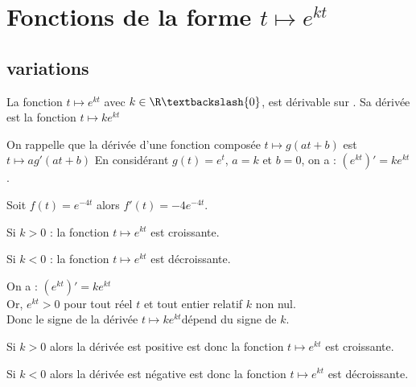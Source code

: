     \section{Fonctions de la forme $t\mapsto e^{kt}$}
        \subsection{variations}
            \begin{bprop}
                La fonction $t\mapsto e^{kt}$ avec $k\in \R\textbackslash \{0 \}$, est dérivable sur \R. Sa dérivée est la fonction  $t\mapsto ke^{kt}$
            \end{bprop}
            
            \begin{bdemo}
                On rappelle que la dérivée d'une fonction composée $t\mapsto g(at+b)$ est $t\mapsto ag'(at+b)$
                En considérant $g(t)=e^t$, $a=k$ et $b=0$, on a : $(e^{kt})'=ke^{kt}$.
            \end{bdemo}
            
            \begin{bexemple}
                Soit $f(t)=e^{-4t}$ alors $f'(t)=-4e^{-4t}$.
            \end{bexemple}
            
            \begin{bprop}
                \begin{itemDef}
                    \item Si $k > 0$ : la fonction $t\mapsto e^{kt}$ est croissante.
                    \item Si $k < 0$ : la fonction $t\mapsto e^{kt}$ est décroissante.
                \end{itemDef}
            \end{bprop}
            
            \begin{bdemo}
                On a : $(e^{kt} )'=ke^{kt}$\\
                Or, $e^{kt}>0$ pour tout réel $t$ et tout entier relatif $k$ non nul.\\
                Donc le signe de la dérivée $t\mapsto ke^{kt}$dépend du signe de $k$.\\
                \begin{itemDem}
                \item Si $k > 0$ alors la dérivée est positive est donc la fonction $t\mapsto e^{kt}$ est croissante.
                \item Si $k < 0$ alors la dérivée est négative est donc la fonction $t\mapsto e^{kt}$ est décroissante.\\
                \end{itemDem}
            \end{bdemo}
            
